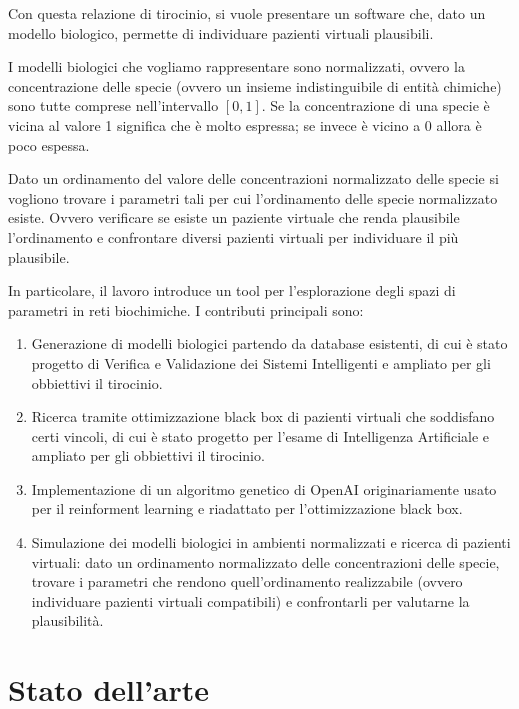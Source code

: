 Con questa relazione di tirocinio, si vuole presentare un software che, dato un modello biologico, permette di individuare pazienti virtuali plausibili.

I modelli biologici che vogliamo rappresentare sono normalizzati, ovvero la concentrazione delle specie (ovvero un insieme indistinguibile di entità chimiche) sono tutte comprese nell'intervallo $[0,1]$. Se la concentrazione di una specie è vicina al valore 1 significa che è molto espressa;
se invece è vicino a 0 allora è poco espessa.

Dato un ordinamento del valore delle concentrazioni normalizzato delle specie si vogliono trovare i parametri tali per cui l'ordinamento delle specie normalizzato esiste. Ovvero verificare 
se esiste un paziente virtuale che renda plausibile l'ordinamento e confrontare diversi pazienti virtuali per individuare il più plausibile.

In particolare, il lavoro introduce un tool per l'esplorazione degli spazi di parametri in reti biochimiche. I contributi principali sono:

\begin{enumerate}
    \item Generazione di modelli biologici partendo da database esistenti, di cui è stato progetto di Verifica e Validazione dei Sistemi Intelligenti e ampliato per gli obbiettivi il tirocinio.
    \item Ricerca tramite ottimizzazione black box di pazienti virtuali che soddisfano certi vincoli, di cui è stato progetto per l'esame di Intelligenza Artificiale e ampliato per gli obbiettivi il tirocinio.
    \item Implementazione di un algoritmo genetico di OpenAI originariamente usato per il reinforment learning e riadattato per l'ottimizzazione black box.
    \item Simulazione dei modelli biologici in ambienti normalizzati e ricerca di pazienti virtuali: dato un ordinamento normalizzato delle concentrazioni delle specie, trovare i parametri che rendono quell'ordinamento realizzabile (ovvero individuare pazienti virtuali compatibili) e confrontarli per valutarne la plausibilità.
\end{enumerate}

\section{Stato dell'arte}



